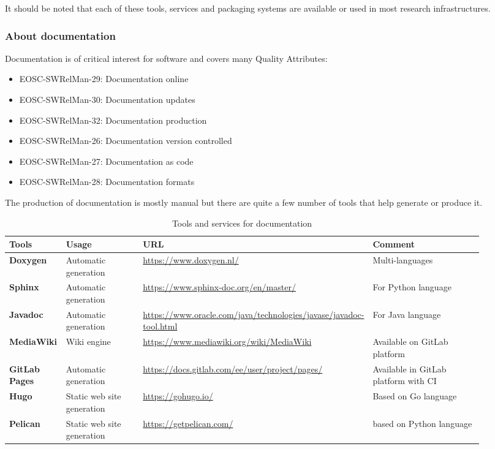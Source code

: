It should be noted that each of these tools, services and packaging systems are available or used in most research infrastructures.

\subsubsection{About documentation}

Documentation is of critical interest for software and covers many Quality Attributes: 

\begin{itemize}
  \item EOSC-SWRelMan-29: Documentation online
  \item EOSC-SWRelMan-30: Documentation updates
  \item EOSC-SWRelMan-32: Documentation production
  \item EOSC-SWRelMan-26: Documentation version controlled
  \item EOSC-SWRelMan-27: Documentation as code
  \item EOSC-SWRelMan-28: Documentation formats
\end{itemize}

The production of documentation is mostly manual but there are quite a few number of tools that help generate or produce it.

\begin{table}[h]
  \centering
  \scriptsize
  \begin{tabular}{|p{0.12\linewidth}|p{0.18\linewidth}|p{0.33\linewidth}|p{0.27\linewidth}|} \hline

    \textbf{Tools} & \textbf{Usage} & \textbf{URL} & \textbf{Comment} \\ \hline \hline
    \textbf{Doxygen} & Automatic generation & \url{https://www.doxygen.nl/} & Multi-languages \\ \hline
    \textbf{Sphinx} & Automatic generation & \url{https://www.sphinx-doc.org/en/master/} & For Python language \\ \hline
    \textbf{Javadoc} & Automatic generation & \url{https://www.oracle.com/java/technologies/javase/javadoc-tool.html} & For Java language  \\ \hline
    \textbf{MediaWiki} & Wiki engine & \url{https://www.mediawiki.org/wiki/MediaWiki} &  Available on GitLab platform \\ \hline
    \textbf{GitLab Pages} & Automatic generation & \url{https://docs.gitlab.com/ee/user/project/pages/} & Available in GitLab platform with CI  \\ \hline
    \textbf{Hugo} & Static web site generation & \url{https://gohugo.io/} & Based on Go language \\ \hline
    \textbf{Pelican} & Static web site generation & \url{https://getpelican.com/} & based on Python language \\ \hline

  \end{tabular}
  \caption{Tools and services for documentation}
  \label{tab:tools_pack02}
\end{table}

